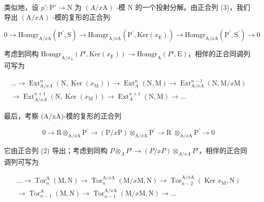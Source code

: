 类似地，设 \(p' : \mathrm{P}' \to \mathrm{N}\) 为 \((A / x\mathrm{A})\) -模 \(\mathrm{N}\) 的一个投射分解。由正合列 (3)，我们导出 \((\mathrm{A} / x\mathrm{A})\) -模的复形的正合列

\[
0 \to \mathrm{Homgr} _ {\mathrm{A} / x \mathrm{A}} (\mathrm{P} ^ {\prime}, \mathrm{S}) \longrightarrow \mathrm{Homgr} _ {\mathrm{A} / x \mathrm{A}} (\mathrm{P} ^ {\prime}, \mathrm{Ker} (x _ {\mathrm{E}})) \longrightarrow \mathrm{Homgr} _ {\mathrm{A} / x \mathrm{A}} (\mathrm{P} ^ {\prime}, \mathrm{S} ^ {\prime}) \rightarrow 0
\]

考虑到同构 \(\mathrm{Homgr}_{\mathrm{A}/x_{\mathrm{A}}}(P',\mathrm{Ker}(x_{\mathrm{F}})) \longrightarrow \mathrm{Homgr}_{\mathrm{A}}(P',\mathrm{E})\)，相伴的正合同调列可写为

\[
\begin{array}{c} \dots \longrightarrow \operatorname{Ext} _ {\mathrm{A} / x A} ^ {n} (\mathrm{N}, \operatorname{Ker} (x _ {\mathrm{M}})) \longrightarrow \operatorname{Ext} _ {A} ^ {n} (\mathrm{N}, \mathrm{M}) \longrightarrow \operatorname{Ext} _ {\mathrm{A} / x A} ^ {n - 1} (\mathrm{N}, \mathrm{M} / x \mathrm{M}) \\ \longrightarrow \operatorname{Ext} _ {A / x A} ^ {n + 1} (\mathrm{N}, \operatorname{Ker} (x _ {\mathrm{M}})) \longrightarrow \operatorname{Ext} _ {A} ^ {n + 1} (\mathrm{N}, \mathrm{M}) \longrightarrow \dots \end{array}\tag{5}
\]

最后，考察 (A/xA)-模的复形的正合列

\[
0 \rightarrow \mathrm{R} \otimes_ {\mathrm{A} / x \mathrm{A}} \mathrm{P} ^ {\prime} \longrightarrow (\mathrm{P} / x \mathrm{P}) \otimes_ {\mathrm{A} / x \mathrm{A}} \mathrm{P} ^ {\prime} \longrightarrow \mathrm{R} ^ {\prime} \otimes_ {\mathrm{A} / x \mathrm{A}} \mathrm{P} ^ {\prime} \rightarrow 0
\]

它由正合列 (2) 导出；考虑到同构 \(P \otimes_{A} P' \longrightarrow (P/xP) \otimes_{A/xA} P'\)，相伴的正合同调列可写为

\[
\begin{array}{c} \ldots \longrightarrow \operatorname{Tor} _ {n} ^ {\mathrm{A}} (\mathrm{M}, \mathrm{N}) \longrightarrow \operatorname{Tor} _ {n} ^ {\mathrm{A} / x \mathrm{A}} (\mathrm{M} / x \mathrm{M}, \mathrm{N}) \longrightarrow \operatorname{Tor} _ {n - 2} ^ {\mathrm{A} / x \mathrm{A}} (\operatorname{Ker} x _ {\mathrm{M}}, \mathrm{N}) \\ \longrightarrow \operatorname{Tor} _ {n - 1} ^ {\mathrm{A}} (\mathrm{M}, \mathrm{N}) \longrightarrow \operatorname{Tor} _ {n - 1} ^ {\mathrm{A} / x \mathrm{A}} (\mathrm{M} / x \mathrm{M}, \mathrm{N}) \longrightarrow \ldots \end{array}\tag{6}
\]

